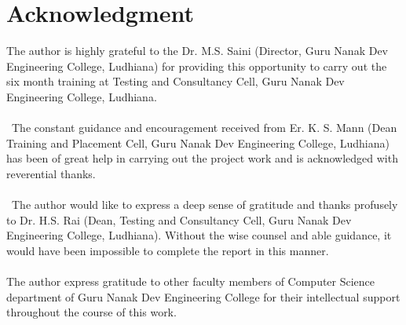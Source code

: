 \section*{Acknowledgment}                           %
The author is highly grateful to the Dr. M.S. Saini (Director, Guru Nanak Dev Engineering College, Ludhiana) for providing this opportunity to carry out the six month training at Testing and Consultancy Cell, Guru Nanak Dev Engineering College, Ludhiana.\\ \\
 The constant guidance and encouragement received from Er. K. S. Mann (Dean Training and Placement Cell, Guru Nanak Dev Engineering
College, Ludhiana) has been of great help in carrying out the project work and is acknowledged with reverential thanks.\\ \\
 The author would like to express a deep sense of gratitude and thanks profusely to Dr. H.S. Rai (Dean, Testing and Consultancy Cell, Guru Nanak Dev Engineering College, Ludhiana). Without the wise counsel and able guidance, it would have been impossible to complete the report in this manner. \\ \\
The author express gratitude to other faculty members of Computer Science department of Guru Nanak Dev Engineering College for their intellectual support throughout the course of this work.\\ \\

